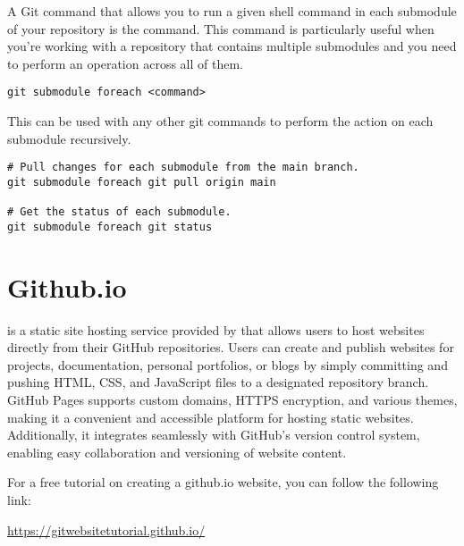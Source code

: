 A Git command that allows you to run a given shell command in each submodule of your repository is the  command. This command is particularly useful when you're working with a repository that contains multiple submodules and you need to perform an operation across all of them.
\begin{lstlisting}[style=terminalstyle]
git submodule foreach <command>
\end{lstlisting}

This can be used with any other git commands to perform the action on each submodule recursively.
\begin{lstlisting}[style=terminalstyle]
# Pull changes for each submodule from the main branch.
git submodule foreach git pull origin main

# Get the status of each submodule.
git submodule foreach git status
\end{lstlisting}






\section{Github.io}

 is a static site hosting service provided by  that allows users to host websites directly from their GitHub repositories. Users can create and publish websites for projects, documentation, personal portfolios, or blogs by simply committing and pushing HTML, CSS, and JavaScript files to a designated repository branch. GitHub Pages supports custom domains, HTTPS encryption, and various themes, making it a convenient and accessible platform for hosting static websites. Additionally, it integrates seamlessly with GitHub's version control system, enabling easy collaboration and versioning of website content.

\begin{urlbox}
For a free tutorial on creating a github.io website, you can follow the following link:

\url{https://gitwebsitetutorial.github.io/}
\end{urlbox}
